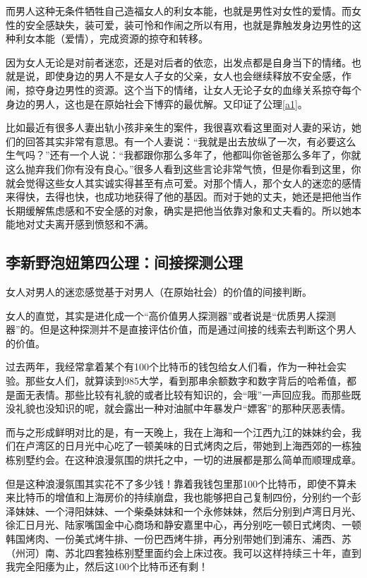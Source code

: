 而男人这种无条件牺牲自己造福女人的利女本能，也就是男性对女性的爱情。而女性的安全感缺失，装可爱，装可怜和作闹之所以有用，也就是靠触发身边男性的这种利女本能（爱情），完成资源的掠夺和转移。

因为女人无论是对前者迷恋，还是对后者的依恋，出发点都是自身当下的情绪。也就是说，即使身边的男人不是女人子女的父亲，女人也会继续释放不安全感，作闹，掠夺身边男性的资源。这个当下的情绪，让女人无论子女的血缘关系掠夺每个身边的男人，这也是在原始社会下博弈的最优解。又印证了公理\ref{a1}。

比如最近有很多人妻出轨小孩非亲生的案件，我很喜欢看这里面对人妻的采访，她们的回答其实非常有意思。有一个人妻说：``我就是出去放纵了一次，有必要这么生气吗？''还有一个人说：``我都跟你那么多年了，他都叫你爸爸那么多年了，你就这么抛弃我们你有没有良心。''很多人看到这些言论非常气愤，但是你看到这里，你就会觉得这些女人其实诚实得甚至有点可爱。对那个情人，那个女人的迷恋的感情来得快，去得也快，也成功地获得了他的基因。而对于她的丈夫，她还是把他当作长期缓解焦虑感和不安全感的对象，确实是把他当依靠对象和丈夫看的。所以她本能地对丈夫离开感到愤怒和不满。

\subsection{李新野泡妞第四公理：间接探测公理}

\begin{axiom}\label{a4}
女人对男人的迷恋感觉基于对男人（在原始社会）的价值的间接判断。
\end{axiom}

女人的直觉，其实是进化成一个``高价值男人探测器''或者说是``优质男人探测器''的。但是这种探测并不是直接评估价值，而是通过间接的线索去判断这个男人的价值。

过去两年，我经常拿着某个有100个比特币的钱包给女人们看，作为一种社会实验。那些女人们，就算读到985大学，看到那串余额数字和数字背后的哈希值，都是面无表情。那些比较有礼貌的或者比较有知识的，会``哦''一声回应我。而那些既没礼貌也没知识的呢，就会露出一种对油腻中年暴发户``嫖客''的那种厌恶表情。

而与之形成鲜明对比的是，有一天晚上，我在上海和一个江西九江的妹妹约会，我们在卢湾区的日月光中心吃了一顿美味的日式烤肉之后，带她到上海西郊的一栋独栋别墅约会。在这种浪漫氛围的烘托之中，一切的进展都是那么简单而顺理成章。

但是这种浪漫氛围其实花不了多少钱！靠着我钱包里那100个比特币，即使不算未来比特币的增值和上海房价的持续崩盘，我也能够把自己复制四份，分别约一个彭泽妹妹、一个浔阳妹妹、一个柴桑妹妹和一个永修妹妹，然后分别到卢湾日月光、徐汇日月光、陆家嘴国金中心商场和静安嘉里中心，再分别吃一顿日式烤肉、一顿韩国烤肉、一份美式烤牛排、一份巴西烤牛排，再分别带她们到浦东、浦西、苏（州河）南、苏北四套独栋别墅里面约会上床过夜。我可以这样持续三十年，直到我完全阳痿为止，然后这100个比特币还有剩！

